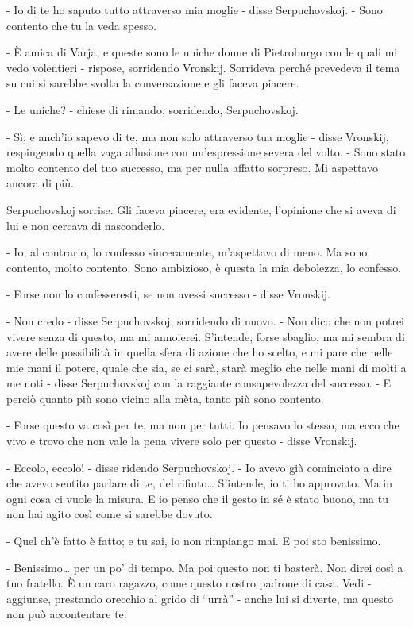 - Io di te ho saputo tutto attraverso mia moglie - disse Serpuchovskoj. - Sono contento che tu la veda spesso. 

- È amica di Varja, e queste sono le uniche donne di Pietroburgo con le quali mi vedo volentieri - rispose, sorridendo Vronskij. Sorrideva perché prevedeva il tema su cui si sarebbe svolta la conversazione e gli faceva piacere. 

- Le uniche? - chiese di rimando, sorridendo, Serpuchovskoj. 

- Sì, e anch'io sapevo di te, ma non solo attraverso tua moglie - disse Vronskij, respingendo quella vaga allusione con un'espressione severa del volto. - Sono stato molto contento del tuo successo, ma per nulla affatto sorpreso. Mi aspettavo ancora di più. 

Serpuchovskoj sorrise. Gli faceva piacere, era evidente, l'opinione che si aveva di lui e non cercava di nasconderlo. 

- Io, al contrario, lo confesso sinceramente, m'aspettavo di meno. Ma sono contento, molto contento. Sono ambizioso, è questa la mia debolezza, lo confesso. 

- Forse non lo confesseresti, se non avessi successo - disse Vronskij. 

- Non credo - disse Serpuchovskoj, sorridendo di nuovo. - Non dico che non potrei vivere senza di questo, ma mi annoierei. S'intende, forse sbaglio, ma mi sembra di avere delle possibilità in quella sfera di azione che ho scelto, e mi pare che nelle mie mani il potere, quale che sia, se ci sarà, starà meglio che nelle mani di molti a me noti - disse Serpuchovskoj con la raggiante consapevolezza del successo. - E perciò quanto più sono vicino alla mèta, tanto più sono contento. 

- Forse questo va così per te, ma non per tutti. Io pensavo lo stesso, ma ecco che vivo e trovo che non vale la pena vivere solo per questo - disse Vronskij. 

- Eccolo, eccolo! - disse ridendo Serpuchovskoj. - Io avevo già cominciato a dire che avevo sentito parlare di te, del rifiuto\ldots{} S'intende, io ti ho approvato. Ma in ogni cosa ci vuole la misura. E io penso che il gesto in sé è stato buono, ma tu non hai agito così come si sarebbe dovuto. 

- Quel ch'è fatto è fatto; e tu sai, io non rimpiango mai. E poi sto benissimo. 

- Benissimo\ldots{} per un po' di tempo. Ma poi questo non ti basterà. Non direi così a tuo fratello. È un caro ragazzo, come questo nostro padrone di casa. Vedi - aggiunse, prestando orecchio al grido di ``urrà'' - anche lui si diverte, ma questo non può accontentare te. 


